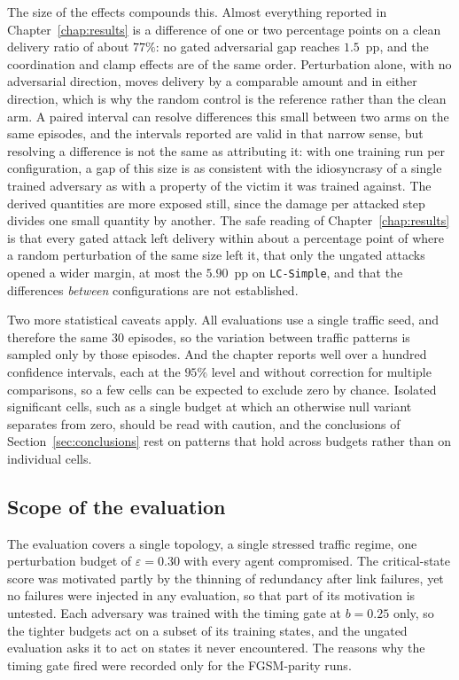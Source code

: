 The size of the effects compounds this. Almost everything reported in
Chapter~\ref{chap:results} is a difference of one or two percentage points on a clean
delivery ratio of about $77\%$: no gated adversarial gap reaches $1.5$~pp, and the
coordination and clamp effects are of the same order. Perturbation alone, with no
adversarial direction, moves delivery by a comparable amount and in either direction,
which is why the random control is the reference rather than the clean arm. A paired
interval can resolve differences this small between two arms on the same episodes, and
the intervals reported are valid in that narrow sense, but resolving a difference is not
the same as attributing it: with one training run per configuration, a gap of this size
is as consistent with the idiosyncrasy of a single trained adversary as with a property
of the victim it was trained against. The derived quantities are more exposed still,
since the damage per attacked step divides one small quantity by another. The safe
reading of Chapter~\ref{chap:results} is that every gated attack left delivery within
about a percentage point of where a random perturbation of the same size left it, that
only the ungated attacks opened a wider margin, at most the $5.90$~pp on
\texttt{LC-Simple}, and that the differences \emph{between} configurations are not
established.

Two more statistical caveats apply. All evaluations use a single traffic seed, and
therefore the same 30 episodes, so the variation between traffic patterns is sampled only
by those episodes. And the chapter reports well over a hundred confidence intervals, each
at the $95\%$ level and without correction for multiple comparisons, so a few cells can be
expected to exclude zero by chance. Isolated significant cells, such as a single budget at
which an otherwise null variant separates from zero, should be read with caution, and the
conclusions of Section~\ref{sec:conclusions} rest on patterns that hold across budgets
rather than on individual cells.

\subsection{Scope of the evaluation}
\label{subsec:limitations_scope}

The evaluation covers a single topology, a single stressed traffic regime, one
perturbation budget of $\varepsilon = 0.30$ with
every agent compromised. The critical-state score was motivated partly by the thinning of
redundancy after link failures, yet no failures were injected in any evaluation, so that
part of its motivation is untested. Each adversary was
trained with the timing gate at $b = 0.25$ only, so the tighter budgets act on a subset of
its training states, and the ungated evaluation asks it to act on states it never
encountered. The reasons why the timing gate fired were recorded only for the FGSM-parity
runs.

